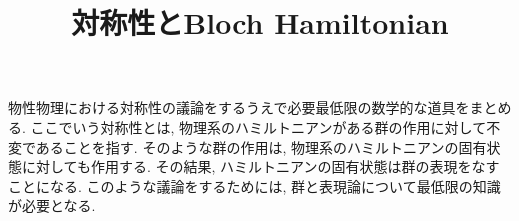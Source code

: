 \documentclass[a4paper,12pt]{jlreq}
\title{対称性とBloch Hamiltonian}
\author{}
\date{}
\begin{document}
\maketitle

物性物理における対称性の議論をするうえで必要最低限の数学的な道具をまとめる. ここでいう対称性とは, 物理系のハミルトニアンがある群の作用に対して不変であることを指す. そのような群の作用は, 物理系のハミルトニアンの固有状態に対しても作用する. その結果, ハミルトニアンの固有状態は群の表現をなすことになる. このような議論をするためには, 群と表現論について最低限の知識が必要となる.









\end{document}
